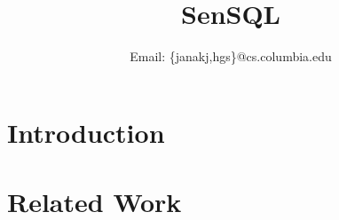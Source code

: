 \documentclass[conference,10pt]{IEEEtran}
\newcommand{\papertitle}{SenSQL}
\begin{document}
\title{\papertitle}

\author{
  Email: \{janakj,hgs\}@cs.columbia.edu
}

\maketitle

\begin{abstract}
\end{abstract}

\section{Introduction}
\label{sec:introduction}

\section{Related Work}
\label{sec:related-work}

\nocite{madden2005tinydb}
\nocite{madden2002supporting}
\nocite{bacon2017spanner}
\nocite{sun2010querying}
\nocite{rfc5222}
\nocite{rfc5582}
\nocite{rfc5012}



\end{document}
